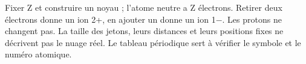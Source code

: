 \par\noindent\begin{minipage}{\linewidth}
\label{cor-activite-2}
Fixer Z et construire un noyau ; l’atome neutre a Z électrons. Retirer deux électrons donne un ion 2+, en ajouter un donne un ion 1−. Les protons ne changent pas. La taille des jetons, leurs distances et leurs positions fixes ne décrivent pas le nuage réel. Le tableau périodique sert à vérifier le symbole et le numéro atomique.\par\end{minipage}
